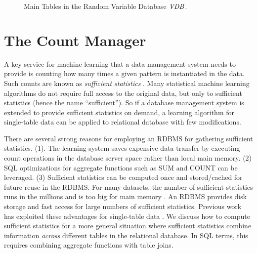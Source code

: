 \documentclass{acm_proc_article-sp}
\begin{document}
\begin{figure}[htbp]
\begin{center}
\caption{Main Tables in the Random Variable Database $\it{VDB}$.
\label{fig:rv_db}}
\end{center}
\end{figure}

\section{The Count Manager} 
A key service for machine learning that a data management system needs to provide is counting how many times a given pattern is instantiated in the data. Such counts are known as {\em sufficient statistics} \cite{Graefe1998}. Many statistical machine learning algorithms do not require full access to the original data, but only to sufficient statistics (hence the name ``sufficient''). So if a database management system is extended to provide sufficient statistics on demand, a learning algorithm for single-table data can be applied to relational database with few modifications. 

There are several strong reasons for employing an RDBMS for gathering sufficient statistics. (1). The learning system saves expensive data transfer by executing count operations in the database server space rather than local main memory. (2) SQL optimizations for aggregate functions such as SUM and COUNT can be leveraged. (3) Sufficient statistics can be computed once and stored/cached for future reuse in the RDBMS. For many datasets, the number of sufficient statistics runs in the millions and is too big for main memory \cite{Moore1998}.  An RDBMS provides disk storage and fast access for large numbers of sufficient statistics. Previous work has exploited these advantages for single-table data \cite{Ordonez2010}. We discuss how to compute sufficient statistics for a more general situation where sufficient statistics combine information {\em across} different tables in the relational database. In SQL terms, this requires combining aggregate functions with table joins. 
\end{document}
